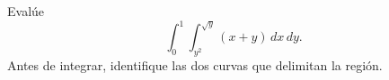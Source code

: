 Evalúe
\[
\int_0^1\int_{y^2}^{\sqrt y}(x+y)\,dx\,dy.
\]
Antes de integrar, identifique las dos curvas que delimitan la región.
